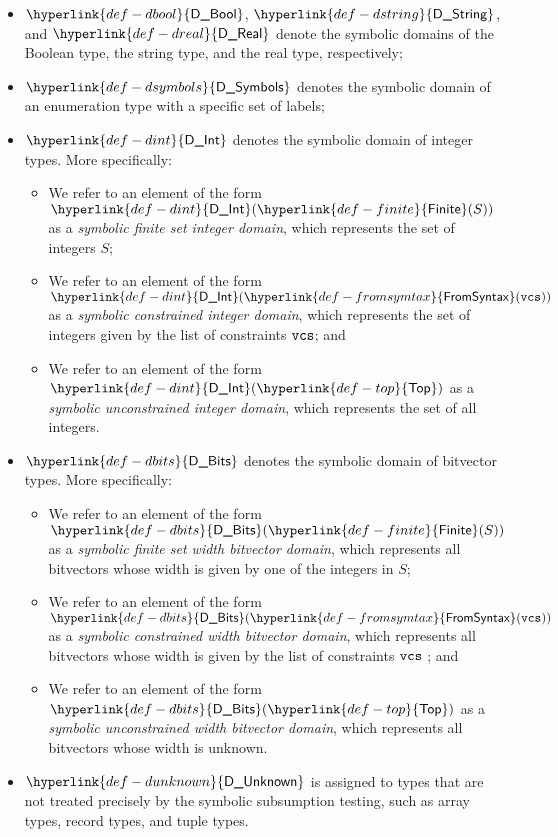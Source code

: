 \documentclass{book}
\newcommand\DBool[0]{\hyperlink{def-dbool}{\textsf{D\_Bool}}}
\newcommand\DString[0]{\hyperlink{def-dstring}{\textsf{D\_String}}}
\newcommand\DReal[0]{\hyperlink{def-dreal}{\textsf{D\_Real}}}
\newcommand\DSymbols[0]{\hyperlink{def-dsymbols}{\textsf{D\_Symbols}}}
\newcommand\DInt[0]{\hyperlink{def-dint}{\textsf{D\_Int}}}
\newcommand\DBits[0]{\hyperlink{def-dbits}{\textsf{D\_Bits}}}
\newcommand\DUnknown[0]{\hyperlink{def-dunknown}{\textsf{D\_Unknown}}}
\newcommand\Finite[0]{\hyperlink{def-finite}{\textsf{Finite}}}
\newcommand\Top[0]{\hyperlink{def-top}{\textsf{Top}}}
\newcommand\FromSyntax[0]{\hyperlink{def-fromsymtax}{\textsf{FromSyntax}}}
\begin{document}
\begin{itemize}
  \item $\DBool$, $\DString$, and $\DReal$ denote the symbolic domains of the Boolean type, the string type,
        and the real type, respectively;
  \item $\DSymbols$ denotes the symbolic domain of an enumeration type with a specific set of labels;
  \item $\DInt$ denotes the symbolic domain of integer types.
        More specifically:
        \begin{itemize}
          \item We refer to an element of the form $\DInt(\Finite(S))$ as a \emph{symbolic finite set integer domain},
                which represents the set of integers $S$;
          \item We refer to an element of the form $\DInt(\FromSyntax(\vcs))$ as a \emph{symbolic constrained integer domain},
                which represents the set of integers given by the list of constraints $\texttt{vcs}$; and
          \item We refer to an element of the form $\DInt(\Top)$ as a \emph{symbolic unconstrained integer domain},
                which represents the set of all integers.
        \end{itemize}
  \item $\DBits$ denotes the symbolic domain of bitvector types.
        More specifically:
        \begin{itemize}
        \item We refer to an element of the form $\DBits(\Finite(S))$ as a \emph{symbolic finite set width bitvector domain},
              which represents all bitvectors whose width is given by one of the integers in $S$;
        \item We refer to an element of the form $\DBits(\FromSyntax(\vcs))$ as a
              \emph{symbolic constrained width bitvector domain}, which represents all bitvectors whose width
              is given by the list of constraints $\texttt{vcs}$ ; and
        \item We refer to an element of the form $\DBits(\Top)$ as a \emph{symbolic unconstrained width bitvector domain},
              which represents all bitvectors whose width is unknown.
        \end{itemize}
  \item $\DUnknown$ is assigned to types that are not treated precisely by the symbolic subsumption testing,
        such as array types, record types, and tuple types.
\end{itemize}
\end{document}
